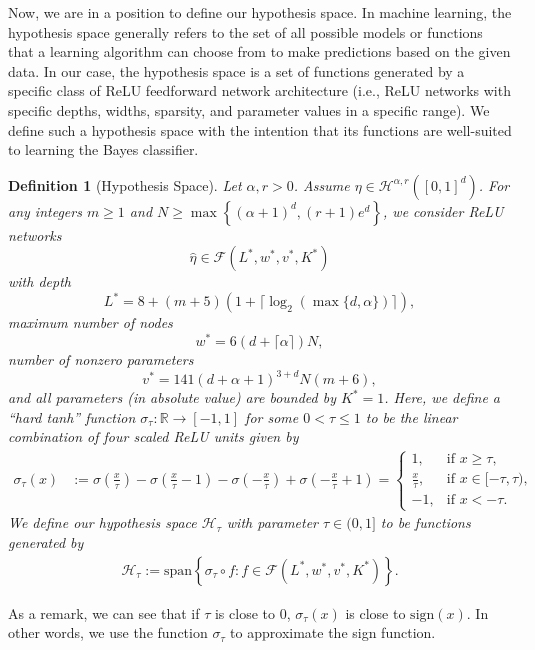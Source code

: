 \documentclass{article}
\def\RR{\mathbb R}
\newtheorem{definition}{Definition}
\begin{document}
 Now, we are in a position to define our hypothesis space. In machine learning, the hypothesis space generally refers to the set of all possible models or functions that a learning algorithm can choose from to make predictions based on the given data. In our case, the hypothesis space is a set of functions generated by a specific class of ReLU feedforward network architecture (i.e., ReLU networks with specific depths, widths, sparsity, and parameter values in a specific range). We define such a hypothesis space with the intention that its functions are well-suited to learning the Bayes classifier.
 \begin{definition}[Hypothesis Space]\label{hypothesis}
    Let $\alpha,r>0$. 
 Assume $\eta \in \mathcal{H}^{\alpha,r}([0,1]^d)$.
 For any integers $m\geq 1$ and $N \geq \max \left\{(\alpha +1)^d, (r+1)e^d\right\}$, 
    we consider ReLU networks  
    \begin{equation*}
        \widehat{\eta} \in \mathcal{F}(L^*, w^*, v^*,K^*)
    \end{equation*} with depth $$L^*= 8+ (m+5)(1+\lceil \log_2(\max\{d,\alpha\}) \rceil),$$  
    maximum number of nodes $$w^* = 6(d+ \lceil \alpha \rceil )N,$$ 
    number of nonzero parameters $$v^*= 141 (d+\alpha +1)^{3+d}N (m+6),$$ and all parameters (in absolute value) are bounded by $K^*= 1$.
    Here, we define a ``hard tanh'' function $\sigma_\tau:\RR \rightarrow [-1,1]$ for some $0<\tau\leq 1$ to be the linear combination of four scaled ReLU units given by  
\begin{align} \label{sigmatau}
    \sigma_\tau (x) &:= \sigma\left(\frac{x}{\tau}\right) - \sigma\left(\frac{x}{\tau} -1\right) - \sigma\left(-\frac{x}{\tau}\right)+\sigma\left(-\frac{x}{\tau}+1\right) 
    =
    \begin{cases} 
      1, & \text{if } x \geq \tau, \\
      \frac{x}{\tau}, & \text{if }  x\in [-\tau,\tau),\\
      -1, & \text{if } x < -\tau.
    \end{cases} 
\end{align}
    We define our hypothesis space $\mathcal{H}_\tau$ with parameter $\tau\in(0,1]$ to be functions generated by 
     \begin{eqnarray*}
         \mathcal{H}_\tau:= \text{span}\left\{\sigma_\tau \circ f: f\in \mathcal{F}(L^*,  w^*, v^*,K^*) \right\}.
     \end{eqnarray*}
 \end{definition}
 As a remark, we can see that if  $\tau$ is close to $0$, $\sigma_\tau (x)$ is close to $\text{sign}(x)$. In other words, we use the function $\sigma_\tau$ to approximate the sign function. 
\end{document}
